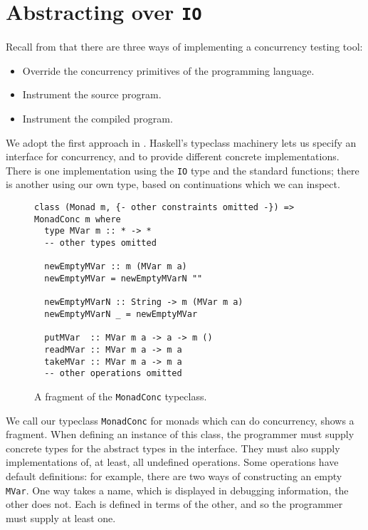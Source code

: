 \section{Abstracting over \texttt{IO}}
\label{sec:dejafu-monadconc}

Recall from  that there are three ways of implementing
a concurrency testing tool:

\begin{itemize}
\item Override the concurrency primitives of the programming language.
\item Instrument the source program.
\item Instrument the compiled program.
\end{itemize}

We adopt the first approach in \dejafu{}.  Haskell's typeclass machinery lets us
specify an interface for concurrency, and to provide different concrete
implementations.  There is one implementation using the \verb|IO| type and the
standard functions; there is another using our own type, based on continuations
which we can inspect.

\begin{figure}[t]
  \centering
  \begin{lstlisting}
class (Monad m, {- other constraints omitted -}) => MonadConc m where
  type MVar m :: * -> *
  -- other types omitted

  newEmptyMVar :: m (MVar m a)
  newEmptyMVar = newEmptyMVarN ""

  newEmptyMVarN :: String -> m (MVar m a)
  newEmptyMVarN _ = newEmptyMVar

  putMVar  :: MVar m a -> a -> m ()
  readMVar :: MVar m a -> m a
  takeMVar :: MVar m a -> m a
  -- other operations omitted
  \end{lstlisting}
  \caption{A fragment of the \texttt{MonadConc} typeclass.}
  \label{fig:monadconc}
\end{figure}

We call our typeclass \verb|MonadConc| for monads which can do concurrency,
 shows a fragment.  When defining an instance of this class,
the programmer must supply concrete types for the abstract types in the
interface.  They must also supply implementations of, at least, all undefined
operations.  Some operations have default definitions: for example, there are
two ways of constructing an empty \verb|MVar|.  One way takes a name, which is
displayed in debugging information, the other does not.  Each is defined in
terms of the other, and so the programmer must supply at least one.

